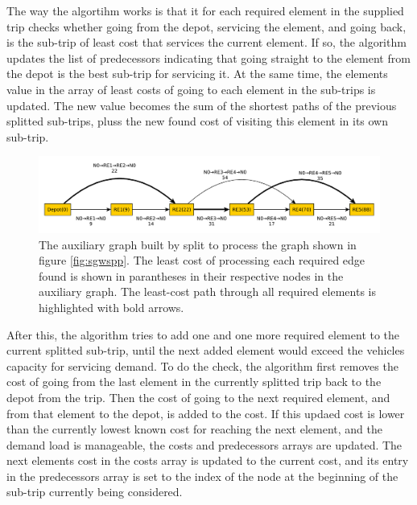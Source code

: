 
The way the algortihm works is that it for each required element in the supplied trip checks whether going from the depot, servicing the element, and going back, is the sub-trip of least cost that services the current element. If so, the algorithm updates the list of predecessors indicating that going straight to the element from the depot is the best sub-trip for servicing it. At the same time, the elements value in the array of least costs of going to each element in the sub-trips is updated. The new value becomes the sum of the shortest paths of the previous splitted sub-trips, pluss the new found cost of visiting this element in its own sub-trip.

\begin{figure}[thbp]
    \centerline{\includegraphics[width=\textwidth]{figures/SplitIllustrations/Split_AuxiliaryGraph.pdf}}
    \caption{The auxiliary graph built by split to process the graph shown in figure \ref{fig:sgwspp}. The least cost of processing each required edge found is shown in parantheses in their respective nodes in the auxiliary graph. The least-cost path through all required elements is highlighted with bold arrows.}
    \label{fig:sag}
\end{figure}

After this, the algorithm tries to add one and one more required element to the current splitted sub-trip, until the next added element would exceed the vehicles capacity for servicing demand. To do the check, the algorithm first removes the cost of going from the last element in the currently splitted trip back to the depot from the trip. Then the cost of going to the next required element, and from that element to the depot, is added to the cost. If this updaed cost is lower than the currently lowest known cost for reaching the next element, and the demand load is manageable, the costs and predecessors arrays are updated. The next elements cost in the costs array is updated to the current cost, and its entry in the predecessors array is set to the index of the node at the beginning of the sub-trip currently being considered.

